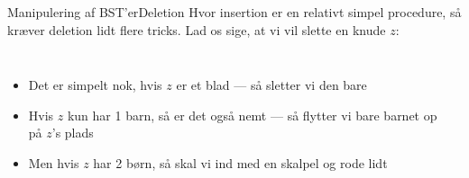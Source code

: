 \documentclass[aspectratio=1610]{beamer}
\begin{document}
\begin{frame}{Manipulering af BST'er}{Deletion}
    Hvor insertion er en relativt simpel procedure, så kræver deletion lidt
    flere tricks. Lad os sige, at vi vil slette en knude $z$:

    \begin{columns}
        \small
        \begin{itemize}[<+(1)->]
            \item Det er simpelt nok, hvis $z$ er et blad --- så sletter vi den bare
            \item Hvis $z$ kun har 1 barn, så er det også nemt --- så flytter vi
                bare barnet op på $z$'s plads
            \item Men hvis $z$ har 2 børn, så skal vi ind med en skalpel og rode
                lidt
        \end{itemize}    
    

        \begin{columns}
            \centering

        
        
        

\end{columns}
\end{columns}
\end{frame}
\end{document}
